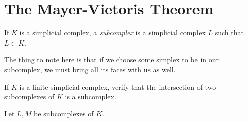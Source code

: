 \section{The Mayer-Vietoris Theorem}
\begin{definition}[Subcomplex]
  If $K$ is a simplicial complex, a \emph{subcomplex} is a simplicial complex
  $L$ such that $L \subset K$.
\end{definition}
\begin{note}
  The thing to note here is that if we choose some simplex to be in our
  subcomplex, we must bring all its faces with us as well.
\end{note}
\begin{problem}[16.31]
  If $K$ is a finite simplicial complex, verify that the intersection of two
  subcomplexes of $K$ is a subcomplex.
\end{problem}
\begin{solution}
  Let $L, M$ be subcomplexes of $K$.
\end{solution}

